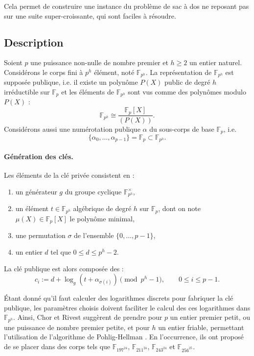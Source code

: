 \documentclass[a4paper, titlepage, 11pt]{article}
\theoremstyle{definition}
\theoremstyle{remark}
\def\gf #1{\mathbb{F}_{#1}}
\begin{document}
Cela permet de construire une instance du problème de sac à dos ne reposant pas sur une suite super-croissante, qui sont faciles à résoudre.

\subsection{Description}

Soient $p$ une puissance non-nulle de nombre premier et $h \geqslant 2$ un entier naturel. Considérons le corps fini à $p^h$ élément, noté $\gf{p^h}$. La représentation de $\gf{p^h}$ est supposée publique, i.e. il existe un polynôme $P(X)$ public de degré $h$ irréductible sur $\gf{p}$ et les éléments de $\gf{p^h}$ sont vus comme des polynômes modulo $P(X)$ :
$$\gf{p^h} \cong \frac{\gf{p}[X]}{(P(X))}.$$
Considérons aussi une numérotation publique $\alpha$ du sous-corps de base $\gf{p}$, i.e. $$\{\alpha_0,\dots, \alpha_{p-1}\} = \gf{p} \subset \gf{p^h}.$$

\paragraph{Génération des clés.} Les éléments de la clé privée consistent en :
\begin{enumerate}
\item un générateur $g$ du groupe cyclique $\gf{p^h}^\times$,
\item un élément $t \in \gf{p^h}$ algébrique de degré $h$ sur $\gf{p}$, dont on note $\mu(X) \in \gf{p}[X]$ le polynôme minimal,
\item une permutation $\sigma$ de l'ensemble $\{0, \dots, p-1\}$,
\item un entier $d$ tel que $0 \leqslant d \leqslant p^h-2$.
\end{enumerate}
La clé publique est alors composée des :
$$c_i := d + \log_g\left(t + \alpha_{\sigma(i)}\right) \pmod{p^h-1}, \qquad 0 \leqslant i \leqslant p-1.$$

\'Etant donné qu'il faut calculer des logarithmes discrets pour fabriquer la clé publique, les paramètres choisis doivent faciliter le calcul des ces logarithmes dans $\gf{p^h}$. Ainsi, Chor et Rivest suggèrent de prendre pour $p$ un entier premier petit, ou une puissance de nombre premier petite, et pour $h$ un entier friable, permettant l'utilisation de l'algorithme de Pohlig-Hellman \cite{pohligHellman1978}. En l’occurrence, ils ont proposé de se placer dans des corps tels que $\gf{197^{24}}$, $\gf{211^{24}}$, $\gf{243^{24}}$ et $\gf{256^{25}}$.
\end{document}
